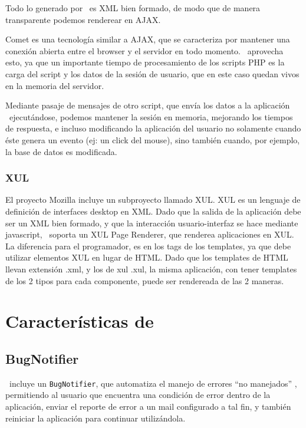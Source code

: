 Todo lo generado por \PWB \ es XML bien formado, de modo que de manera transparente podemos renderear en AJAX.

Comet es una tecnología similar a AJAX, que se caracteriza por mantener una conexión abierta entre el browser y el servidor en todo momento. \PWB \ aprovecha esto, ya que un importante tiempo de procesamiento de los scripts PHP es la carga del script y los datos de la sesión de usuario, que en este caso quedan vivos en la memoria del servidor.

Mediante pasaje de mensajes de otro script, que envía los datos a la aplicación \PWB \ ejecutándose, podemos mantener la sesión en memoria, mejorando los tiempos de respuesta, e incluso modificando la aplicación del usuario no solamente cuando éste genera un evento (ej: un click del mouse), sino también cuando, por ejemplo, la base de datos es modificada.

\subsubsection{XUL}

El proyecto Mozilla incluye un subproyecto llamado XUL\cite{XUL}. XUL es un lenguaje de definición de interfaces desktop en XML. Dado que la salida de la aplicación debe ser un XML bien formado, y que la interacción usuario-interfaz se hace mediante javascript, \PWB \ soporta un XUL Page Renderer, que renderea aplicaciones en XUL. La diferencia para el programador, es en los tags de los templates, ya que debe utilizar elementos XUL en lugar de HTML. Dado que los templates de HTML llevan extensión .xml, y los de xul .xul, la misma aplicación, con tener templates de los 2 tipos para cada componente, puede ser rendereada de las 2 maneras.

\section{Características de \PITS}

\subsection{BugNotifier}

\PWB \ incluye un \verb"BugNotifier", que automatiza el manejo de errores ``no manejados'' , permitiendo al usuario que encuentra una condición de error dentro de la aplicación, enviar el reporte de error a un mail configurado a tal fin, y también reiniciar la aplicación para continuar utilizándola.

